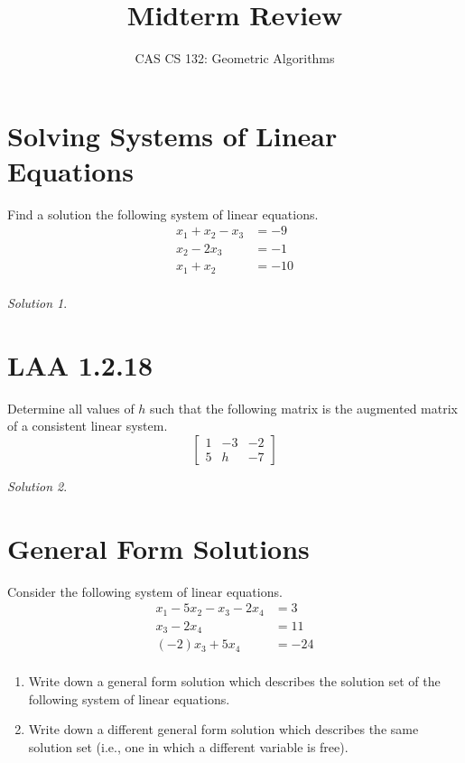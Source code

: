 \documentclass{article}
\title{
  Midterm Review
}
\author{CAS CS 132: Geometric Algorithms}
\date{}
\theoremstyle{remark}
\newtheorem*{solution}{Solution}
\begin{document}
\maketitle

\pagebreak
\section{Solving Systems of Linear Equations}
Find a solution the following system of linear equations.
\begin{align*}
  x_1 + x_2 - x_3 &= -9 \\
  x_2 - 2x_3 &= -1 \\
  x_1 + x_2 &= -10 \\
\end{align*}

\begin{solution}
\end{solution}

\pagebreak
\section{LAA 1.2.18}
Determine all values of $h$ such that the following matrix is the augmented matrix of a consistent linear system.
\begin{displaymath}
  \begin{bmatrix}
    1 & -3 & -2 \\
    5 & h & -7
  \end{bmatrix}
\end{displaymath}

\medskip

\begin{solution}
\end{solution}

\pagebreak
\section{General Form Solutions}
Consider the following system of linear equations.
\begin{align*}
  x_1 - 5x_2 - x_3 - 2x_4 &= 3 \\
  x_3 - 2x_4 &= 11 \\
  (-2)x_3 + 5x_4 &= -24 \\
\end{align*}
\begin{enumerate}
\item Write down a general form solution which describes the solution set of the following system of linear equations.
\item Write down a different general form solution which describes the same solution set (i.e., one in which a different variable is free).
\end{enumerate}
\end{document}
